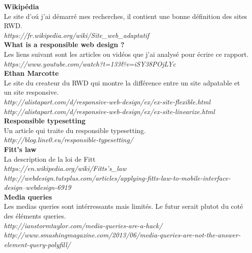 \documentclass{article}
\begin{document}
\textbf{Wikip\'edia}\\
Le site d'o\'u j'ai d\'emarr\'e mes recherches, il contient une bonne d\'efinition des sites RWD.\\
\textit{https://fr.wikipedia.org/wiki/Site\_web\_adaptatif}
\vspace{0.5cm}\\
\textbf{What is a responsible web design ?}\\
Les liens suivant sont les articles ou vid\'eos que j'ai analys\'e pour \'ecrire ce rapport.\\
\textit{https://www.youtube.com/watch?t=133\&v=iSY38POjLYc}
\vspace{0.5cm}\\
\textbf{Ethan Marcotte}\\
Le site du createur du RWD qui montre la diff\'erence entre un site adpatable et un site responsive.\\
\textit{http://alistapart.com/d/responsive-web-design/ex/ex-site-flexible.html}\\
\textit{http://alistapart.com/d/responsive-web-design/ex/ex-site-linearize.html}
\vspace{0.5cm}\\
\textbf{Responsible typesetting}\\
Un article qui traite du responsible typesetting.\\
\textit{http://blog.line0.eu/responsible-typesetting/}
\vspace{0.5cm}\\
\textbf{Fitt's law}\\
La description de la loi de Fitt\\
\textit{https://en.wikipedia.org/wiki/Fitts's\_law}\\
\textit{http://webdesign.tutsplus.com/articles/applying-fitts-law-to-mobile-interface-design--webdesign-6919}
\vspace{0.5cm}\\
\textbf{Media queries}\\
Les medias queries sont int\'erressants mais limit\'es. Le futur serait plutot du cot\'e des \'el\'ements queries.\\
\textit{http://ianstormtaylor.com/media-queries-are-a-hack/}\\
\textit{http://www.smashingmagazine.com/2013/06/media-queries-are-not-the-answer-element-query-polyfill/}\\
\end{document}
